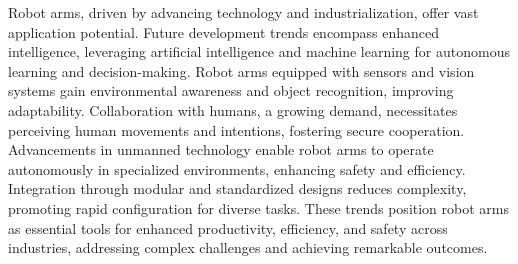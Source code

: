 Robot arms, driven by advancing technology and industrialization, offer vast application potential. Future development trends encompass enhanced intelligence, leveraging artificial intelligence and machine learning for autonomous learning and decision-making. Robot arms equipped with sensors and vision systems gain environmental awareness and object recognition, improving adaptability. Collaboration with humans, a growing demand, necessitates perceiving human movements and intentions, fostering secure cooperation. Advancements in unmanned technology enable robot arms to operate autonomously in specialized environments, enhancing safety and efficiency. Integration through modular and standardized designs reduces complexity, promoting rapid configuration for diverse tasks. These trends position robot arms as essential tools for enhanced productivity, efficiency, and safety across industries, addressing complex challenges and achieving remarkable outcomes.